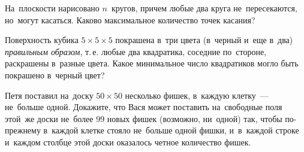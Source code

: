 \begin{problems}

\item
На~плоскости нарисовано $n$~кругов, причем любые два круга не~пересекаются,
но~могут касаться.
Каково максимальное количество точек касания?

\item
Поверхность кубика $5 \times 5 \times 5$ покрашена в~три цвета (в~черный и~еще
в~два) \emph{правильным образом}, т.\,е. любые два квадратика, соседние
по~стороне, раскрашены в~разные цвета.
Какое минимальное число квадратиков могло быть покрашено в~черный цвет?

\item
Петя поставил на~доску $50 \times 50$ несколько фишек, в~каждую клетку~---
не~больше одной.
Докажите, что Вася может поставить на~свободные поля этой~же доски не~более
99 новых фишек (возможно, ни~одной) так, чтобы по-прежнему в~каждой клетке
стояло не~больше одной фишки, и~в~каждой строке и~каждом столбце этой доски
оказалось четное количество фишек.


\end{problems}

